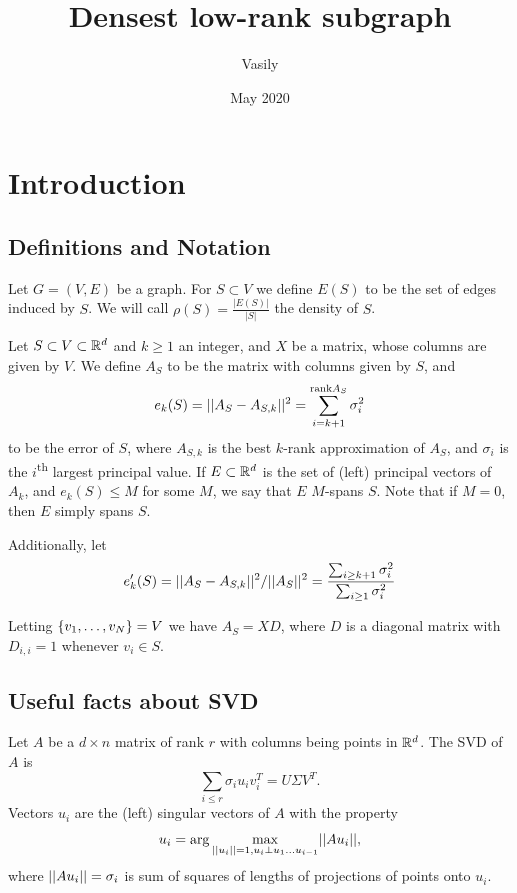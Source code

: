 \documentclass{article}
\title{Densest low-rank subgraph}
\author{Vasily}
\date{May 2020}
\begin{document}
\maketitle

\section{Introduction}
\subsection{Definitions and Notation}
\begin{definition}
Let $G = (V,E)$ be a graph. For $S\subset V$ we define $E(S)$ to be the set of edges induced by $S$. We will call $\rho(S) = \frac{|E(S)|}{|S|}$ the density of $S$.
\end{definition}

\begin{definition}
Let $S\subset V\subset \mathbb{R}^d$ and $k\geq 1$ an integer, and $X$ be a matrix, whose columns are given by $V$. We define $A_S$ to be the matrix with columns given by $S$, and
\begin{equation}\label{eqn: L2 objective, not normalized}
    e_k(S) = ||A_S - A_{S,k}||^2 = \sum_{i=k+1}^{\text{rank} A_S} \sigma_i^2
\end{equation}
to be the error of $S$, where $A_{S,k}$ is the best $k$-rank approximation of $A_S$, and $\sigma_i$ is the
$i$\textsuperscript{th} largest principal value. If $E\subset \mathbb{R}^d$ is the set of (left) principal vectors of $A_k$, and $e_k(S) \leq M$ for some $M$, we say that $E$ $M$-spans $S$. Note that if $M=0$, then $E$ simply spans $S$.

Additionally, let
\begin{equation}\label{eqn: L2 objective, normalized}
    e'_k(S) = ||A_S - A_{S,k}||^2/||A_S||^2 = \frac{\sum_{i\geq k+1} \sigma_i^2}{\sum_{i\geq 1} \sigma_i^2}
\end{equation}
\end{definition}
Letting $\left\{v_1,\dots,v_N\right\} = V$ we have $A_S = X D$, where $D$ is a diagonal matrix with $D_{i,i} = 1$ whenever $v_i \in S$.

\subsection{Useful facts about SVD}
Let $A$ be a $d\times n$ matrix of rank $r$ with columns being points in $\mathbb{R}^d$. The SVD of $A$ is
$$\sum_{i\leq r}\sigma_i u_i v_i^T = U \Sigma V^T.$$
Vectors $u_i$ are the (left) singular vectors of $A$ with the property
$$u_i = \arg \max_{\norm{u_i}=1, u_i \perp u_1\dots u_{i-1}}\norm{A u_i},$$
where $||A u_i|| = \sigma_i$ is sum of squares of lengths of projections of points onto $u_i$.
\end{document}
